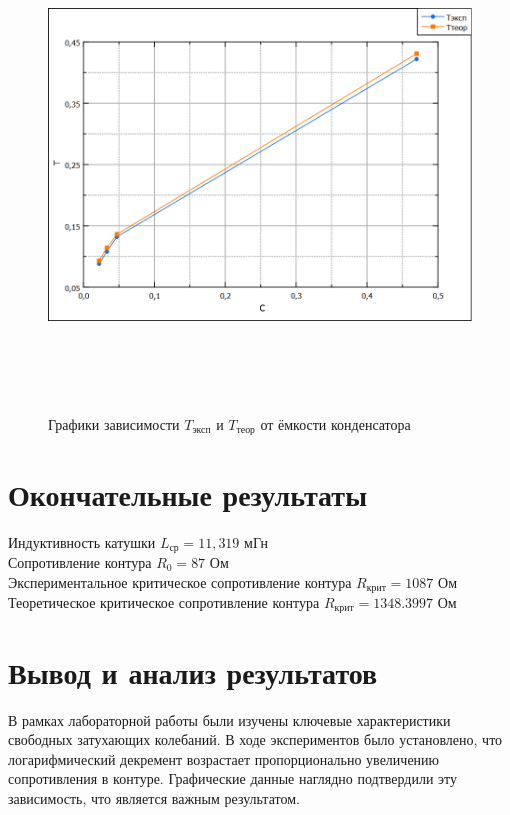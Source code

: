 \documentclass[14pt]{extarticle}
\begin{document}
    \newpage
    \begin{figure}[h!]
        \centering
        \includegraphics[height=13cm]{img/plot3.png}
        \caption{Графики зависимости $T_\text{эксп}$ и $T_\text{теор}$ от ёмкости конденсатора}
    \end{figure}

    \newpage
    \section{Окончательные результаты}
    Индуктивность катушки $L_{\text{ср}} = 11,319$ мГн \\
    Сопротивление контура $R_0 = 87$ Ом \\
    Экспериментальное критическое сопротивление контура $R_{\text{крит}} = 1087$ Ом \\
    Теоретическое критическое сопротивление контура $R_{\text{крит}} = 1348.3997$ Ом 
    
    \section{Вывод и анализ результатов}
    В рамках лабораторной работы были изучены ключевые характеристики свободных затухающих колебаний. В ходе экспериментов было установлено, что логарифмический декремент возрастает пропорционально увеличению сопротивления в контуре. Графические данные наглядно подтвердили эту зависимость, что является важным результатом. \\
\end{document}
